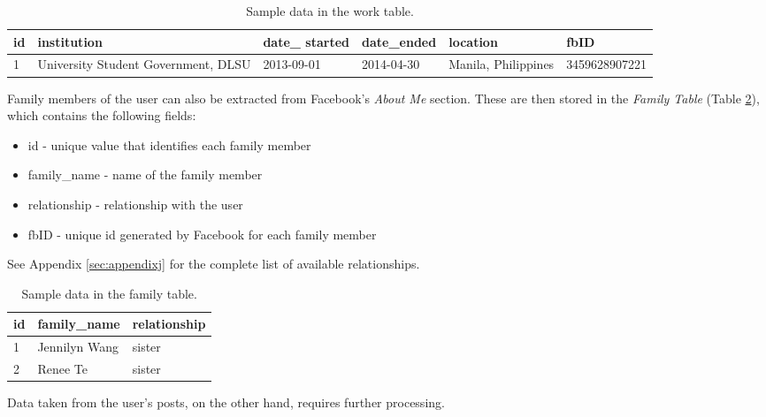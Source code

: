 \begin{table}[ph!]  
	\centering
	\caption{Sample data in the work table.} \vspace{0.25em}
	\begin{tabular}{|p{.5cm}|p{1.5in}|p{2cm}|p{2cm}|p{2cm}|p{2.5cm}|} \hline
		\textbf{id} & \textbf{institution} & \textbf{date\_ \newline started} & \textbf{date\_\newline ended} & \textbf{location} & \textbf{fbID} \\ \hline
		1 & University Student Government, DLSU & 2013-09-01 & 2014-04-30 & Manila, Philippines & 3459628907221 \\ \hline
	\end{tabular}
	\label{tab:work}
\end{table}

Family members of the user can also be extracted from Facebook's \textit{About Me} section. These are then stored in the \textit{Family Table} (Table \ref{tab:Family}), which contains the following fields:
\begin{itemize}
	\item id - unique value that identifies each family member
	\item family\_name - name of the family member
	\item relationship - relationship with the user
	\item fbID - unique id generated by Facebook for each family member
\end{itemize}
See Appendix \ref{sec:appendixj} for the complete list of available relationships.

\begin{table}[ph!]   %
	\centering
	\caption{Sample data in the family table.} \vspace{0.25em}
	\begin{tabular}{|p{1.5cm}|p{2in}|p{1.5in}|} \hline
		\textbf{id} & \textbf{family\_name} & \textbf{relationship} \\ \hline
		1 & Jennilyn Wang & sister \\ \hline
		2 & Renee Te & sister  \\ \hline
	\end{tabular}
	\label{tab:Family}
\end{table}

Data taken from the user's posts, on the other hand, requires further processing.

